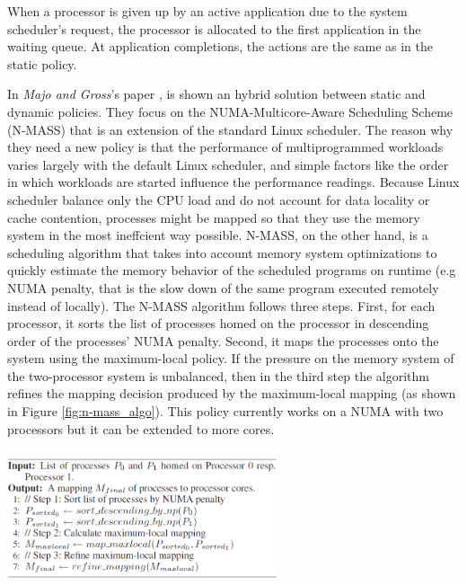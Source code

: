 \documentclass[a4paper,10pt]{article}
\makeatletter
\newenvironment{figurehere}{\def\@captype{figure}\vspace{2ex}}{\vspace{2ex}}
\makeatother
\begin{document}
\begin{multicols}{2}
When a processor is given up by an active application due to the system scheduler's request, the processor is allocated to the first application in the waiting queue. At application completions, the actions are the same as in the static policy.\par
\parindent 10mm In \emph{Majo and Gross}'s paper \cite{Majo_memorymanagement}, is shown an hybrid solution between static and dynamic policies. They focus on the NUMA-Multicore-Aware Scheduling Scheme (N-MASS) that is an extension of the standard Linux scheduler. The reason why they need a new policy is that the performance of multiprogrammed workloads varies largely with the default Linux scheduler, and simple factors like the order in which workloads are started influence the performance readings. Because Linux scheduler balance only the CPU load and do not account for data locality or cache contention, processes might be mapped so that they use the memory system in the most ineffcient way possible. N-MASS, on the other hand, is a scheduling algorithm that takes into account memory system optimizations to quickly estimate the memory behavior of the scheduled programs on runtime (e.g NUMA penalty, that is the slow down of the same program executed remotely instead of locally). The N-MASS algorithm follows three steps. First, for each processor, it sorts the list of processes homed on the processor in descending order of the processes' NUMA penalty. Second, it maps the processes onto the system using the maximum-local policy. If the pressure on the memory system of the two-processor system is unbalanced, then in the third step the algorithm refines the mapping decision produced by the maximum-local mapping (as shown in Figure \ref{fig:n-mass_algo}).
This policy currently works on a NUMA with two processors but it can be extended to more cores.

\begin{figurehere}
 \centering
 \includegraphics[width=8cm, height=4cm]{./eps/n-mass_algo.png}
 \caption{N-MASS: maps n processes onto a 2-processor NUMA-multicore system}
 \label{fig:n-mass_algo}
\end{figurehere}


\end{multicols}
\end{document}
